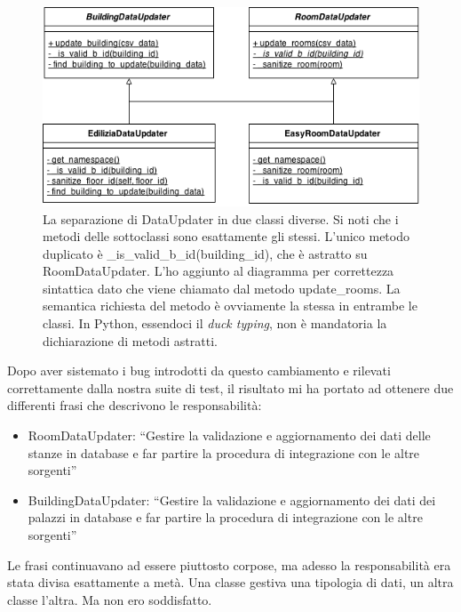 \documentclass[12pt]{report}
\begin{document}
\begin{figure}[H]
    \centering
    \includegraphics[width=340pt]{class_diagram_dataupdater_after.png}
    \caption{La separazione di DataUpdater in due classi diverse. Si noti
    che i metodi delle sottoclassi sono esattamente gli stessi. L'unico metodo
    duplicato è \_is\_valid\_b\_id(building\_id), che è astratto
    su RoomDataUpdater. L'ho aggiunto al diagramma per correttezza 
    sintattica dato che viene chiamato dal metodo update\_rooms. La semantica
    richiesta del metodo è ovviamente la stessa in entrambe le classi.
    In Python, essendoci il \textit{duck typing}, non è mandatoria la
    dichiarazione di metodi astratti. 
    }
    \label{fig:class_diagram_dataupdater_after}
\end{figure}

Dopo aver sistemato i bug introdotti da questo cambiamento e rilevati 
correttamente dalla nostra suite di test, il risultato mi ha portato ad
ottenere due differenti frasi che descrivono le responsabilità:

\begin{itemize}
  \item RoomDataUpdater: ``Gestire la validazione e aggiornamento dei dati delle
  stanze in database e far partire la procedura di integrazione
con le altre sorgenti''
  \item BuildingDataUpdater: ``Gestire la validazione e aggiornamento dei dati 
  dei palazzi in database e far partire la procedura di integrazione
con le altre sorgenti''
\end{itemize}

Le frasi continuavano ad essere piuttosto corpose, ma adesso la responsabilità 
era stata divisa esattamente a metà. Una classe gestiva una tipologia di 
dati, un altra classe l'altra. Ma non ero soddisfatto. 
\end{document}
